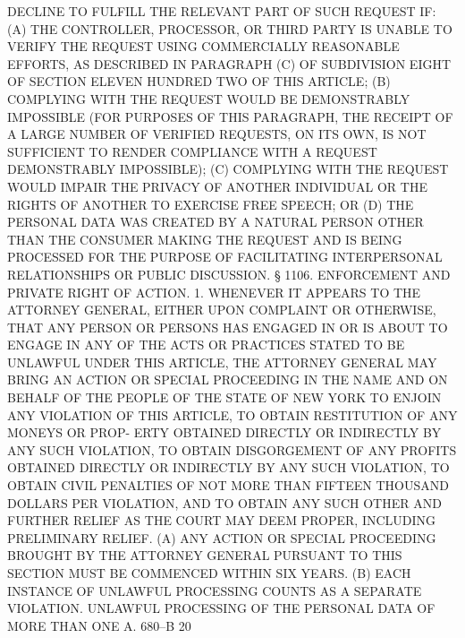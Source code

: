  DECLINE TO FULFILL THE RELEVANT PART OF SUCH REQUEST IF:
   (A)  THE CONTROLLER, PROCESSOR, OR THIRD PARTY IS UNABLE TO VERIFY THE
 REQUEST USING COMMERCIALLY REASONABLE EFFORTS, AS DESCRIBED IN PARAGRAPH
 (C) OF SUBDIVISION EIGHT OF SECTION ELEVEN HUNDRED TWO OF THIS ARTICLE;
   (B) COMPLYING WITH THE REQUEST WOULD BE DEMONSTRABLY  IMPOSSIBLE  (FOR
 PURPOSES  OF  THIS  PARAGRAPH, THE RECEIPT OF A LARGE NUMBER OF VERIFIED
 REQUESTS, ON ITS OWN, IS NOT SUFFICIENT  TO  RENDER  COMPLIANCE  WITH  A
 REQUEST DEMONSTRABLY IMPOSSIBLE);
   (C)  COMPLYING  WITH  THE  REQUEST WOULD IMPAIR THE PRIVACY OF ANOTHER
 INDIVIDUAL OR THE RIGHTS OF ANOTHER TO EXERCISE FREE SPEECH; OR
   (D) THE PERSONAL DATA WAS CREATED BY A NATURAL PERSON OTHER  THAN  THE
 CONSUMER  MAKING  THE  REQUEST AND IS BEING PROCESSED FOR THE PURPOSE OF
 FACILITATING INTERPERSONAL RELATIONSHIPS OR PUBLIC DISCUSSION.
   § 1106. ENFORCEMENT AND  PRIVATE  RIGHT  OF  ACTION.  1.  WHENEVER  IT
 APPEARS  TO  THE  ATTORNEY  GENERAL, EITHER UPON COMPLAINT OR OTHERWISE,
 THAT ANY PERSON OR PERSONS HAS ENGAGED IN OR IS ABOUT TO ENGAGE  IN  ANY
 OF  THE  ACTS OR PRACTICES STATED TO BE UNLAWFUL UNDER THIS ARTICLE, THE
 ATTORNEY GENERAL MAY BRING AN ACTION OR SPECIAL PROCEEDING IN  THE  NAME
 AND  ON  BEHALF  OF  THE  PEOPLE  OF THE STATE OF NEW YORK TO ENJOIN ANY
 VIOLATION OF THIS ARTICLE, TO OBTAIN RESTITUTION OF ANY MONEYS OR  PROP-
 ERTY  OBTAINED  DIRECTLY  OR INDIRECTLY BY ANY SUCH VIOLATION, TO OBTAIN
 DISGORGEMENT OF ANY PROFITS OBTAINED DIRECTLY OR INDIRECTLY BY ANY  SUCH
 VIOLATION,  TO  OBTAIN CIVIL PENALTIES OF NOT MORE THAN FIFTEEN THOUSAND
 DOLLARS PER VIOLATION, AND TO OBTAIN ANY SUCH OTHER AND  FURTHER  RELIEF
 AS THE COURT MAY DEEM PROPER, INCLUDING PRELIMINARY RELIEF.
   (A)  ANY  ACTION OR SPECIAL PROCEEDING BROUGHT BY THE ATTORNEY GENERAL
 PURSUANT TO THIS SECTION MUST BE COMMENCED WITHIN SIX YEARS.
   (B)  EACH  INSTANCE  OF  UNLAWFUL  PROCESSING  COUNTS  AS  A  SEPARATE
 VIOLATION.  UNLAWFUL  PROCESSING  OF  THE PERSONAL DATA OF MORE THAN ONE
 A. 680--B                          20
 
